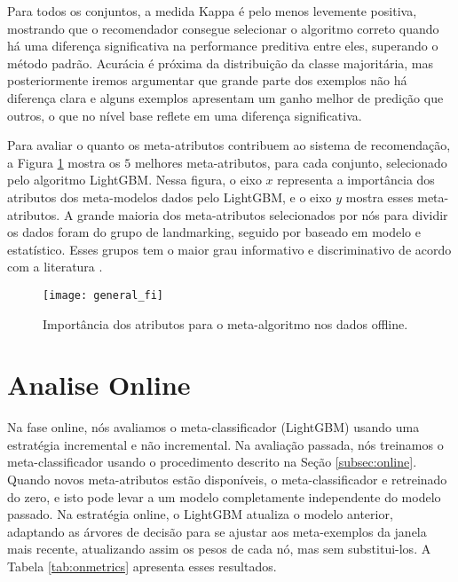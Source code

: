 Para todos os conjuntos, a medida Kappa é pelo menos levemente positiva, mostrando que o recomendador consegue selecionar o algoritmo correto quando há uma diferença significativa na performance preditiva entre eles, superando o método padrão. Acurácia é próxima da distribuição da classe majoritária, mas posteriormente iremos argumentar que grande parte dos exemplos não há diferença clara e alguns exemplos apresentam um ganho melhor de predição que outros, o que no nível base reflete em uma diferença significativa.

Para avaliar o quanto os meta-atributos contribuem ao sistema de recomendação, a Figura \ref{fig:fi} mostra os $5$ melhores meta-atributos, para cada conjunto, selecionado pelo algoritmo LightGBM. Nessa figura, o eixo $x$ representa a importância dos atributos dos meta-modelos dados pelo LightGBM, e o eixo $y$ mostra esses meta-atributos. A grande maioria dos meta-atributos selecionados por nós para dividir os dados foram do grupo de landmarking, seguido por baseado em modelo e estatístico. Esses grupos tem o maior grau informativo e discriminativo de acordo com a literatura \cite{Rivolli2018}.

\begin{figure}[ht]
    \centering
    \texttt{[image: general\_fi]}
    \caption{Importância dos atributos para o meta-algoritmo nos dados offline.}
    \label{fig:fi}
\end{figure}


\section{Analise Online}

Na fase online, nós avaliamos o meta-classificador (LightGBM) usando uma estratégia incremental e não incremental. Na avaliação passada, nós treinamos o meta-classificador usando o procedimento descrito na Seção \ref{subsec:online}. Quando novos meta-atributos estão disponíveis, o meta-classificador e retreinado do zero, e isto pode levar a um modelo completamente independente do modelo passado. Na estratégia online, o LightGBM atualiza o modelo anterior, adaptando as árvores de decisão para se ajustar aos meta-exemplos da janela mais recente, atualizando assim os pesos de cada nó, mas sem substitui-los. A Tabela \ref{tab:onmetrics} apresenta esses resultados.


